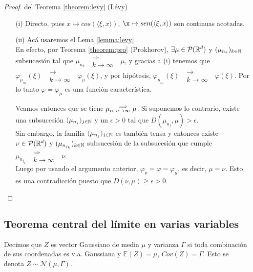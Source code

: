 \begin{proof} del Teorema \ref{theorem:levy} (Lévy)
\gris
\begin{itemize}
    \item[(i)] Directo, pues $x\mapsto cos(\langle\xi,x\rangle)$, $\x\mapsto sen(\langle\xi,x\rangle)$ son continuas acotadas.
    \item[(ii)] Acá usaremos el Lema \ref{lemma:levy}
    \\ En efecto, por Teorema \ref{theorem:pro} (Prokhorov), $\exists\mu\in\mathcal{P}(\mathbb{R}^d)$ y $(\mu_{n_k})_{k\in\mathbb{N}}$ subsucesión tal que $\mu_{n_k}\mbox{ }\substack{\Longrightarrow \\k \to \infty}\mbox{ }\mu$, y gracias a (i) tenemos que $\varphi_{\mu_{n_k}}(\xi)\mbox{ }\substack{\longrightarrow \\k \to \infty}\mbox{ }\varphi_{\mu}(\xi)$, y por hipótesis, $\varphi_{\mu_{n_k}}(\xi)\mbox{ }\substack{\longrightarrow \\k \to \infty}\mbox{ }\varphi(\xi)$.
    Por lo tanto $\varphi=\varphi_\mu$ es una función característica.
    
    Veamos entonces que se tiene $\mu_n\mbox{ }\substack{\Longrightarrow \\n \to \infty}\mbox{ }\mu$. Si suponemos lo contrario, existe una subsucesión $(\mu_{n_j})_{j\in\mathbb{N}}$ y un $\epsilon>0$ tal que $D(\mu_{n_j},\mu)>\epsilon$.
    \\Sin embargo, la familia $(\mu_{n_j})_{j\in\mathbb{N}}$ es también tensa y entonces existe $\nu\in\mathcal{P}(\mathbb{R}^d)$ y $(\mu_{n_{j_k}})_{k\in\mathbb{N}}$ subsucesión de la subsucesión que cumple $\mu_{n_{j_k}}\mbox{ }\substack{\Longrightarrow \\k \to \infty}\mbox{ }\nu$.
    \\ Luego por usando el argumento anterior, $\varphi_\nu=\varphi=\varphi_\mu$, es decir, $\mu=\nu$. Esto es una contradicción puesto que $D(\nu,\mu)\geq\epsilon>0$.
\end{itemize}
\findem
\negro 
\end{proof}

\subsection{Teorema central del límite en varias variables} %
\begin{definition}
\label{gauss}
Decimos que $Z$ es vector Gaussiano de media $\mu$ y varianza $\Gamma$ si toda combinación de sus coordenadas es v.a. Gaussiana y $\mathbb{E}(Z)=\mu$, $Cov(Z)=\Gamma$. Esto se denota $Z\sim\mathcal{N}(\mu,\Gamma)$.
\end{definition}

